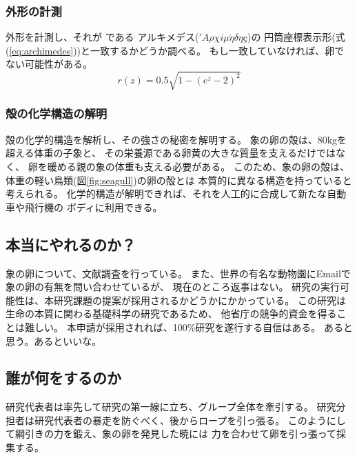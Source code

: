 \documentclass[11pt,a4j,dvipdfmx]{jarticle} 					%
\newcommand{\研究課題名}{象の卵}
\newcommand{\研究機関名}{逢坂大学}
\newcommand{\研究代表者氏名}{湯川秀樹}
\newcommand{\研究期間の最終元号年度}{8}  %
\begin{document}
\subsubsection{外形の計測}
        外形を計測し、それが
        である
        アルキメデス(\('A\rho\chi i\mu\acute{\eta}\delta\eta\mbox{\c{c}}\))の
        円筒座標表示形(式(\ref{eq:archimedes}))と一致するかどうか調べる。
        もし一致していなければ、卵でない可能性がある。
        \begin{equation}
        	\label{eq:archimedes}
        	r(z) = 0.5\sqrt{1-(e^z-2)^2}
        \end{equation}

\subsubsection{殻の化学構造の解明}
	殻の化学的構造を解析し、その強さの秘密を解明する。
	象の卵の殻は、80kgを超える体重の子象と、
	その栄養源である卵黄の大きな質量を支えるだけではなく、
	卵を暖める親の象の体重も支える必要がある。
	このため、象の卵の殻は、体重の軽い鳥類(図\ref{fig:seagull})の卵の殻とは
	本質的に異なる構造を持っていると考えられる。
	化学的構造が解明できれば、それを人工的に合成して新たな自動車や飛行機の
	ボディに利用できる。

\subsection{本当にやれるのか？}
	象の卵について、文献調査を行っている。
	また、世界の有名な動物園にEmailで象の卵の有無を問い合わせているが、
	現在のところ返事はない。
	研究の実行可能性は、本研究課題の提案が採用されるかどうかにかかっている。
	この研究は生命の本質に関わる基礎科学の研究であるため、
	他省庁の競争的資金を得ることは難しい。
	本申請が採用されれば、100\%研究を遂行する自信はある。
	あると思う。あるといいな。

\subsection{誰が何をするのか}
	研究代表者は率先して研究の第一線に立ち、グループ全体を牽引する。
	研究分担者は研究代表者の暴走を防ぐべく、後からロープを引っ張る。
	このようにして綱引きの力を鍛え、象の卵を発見した暁には
	力を合わせて卵を引っ張って採集する。

		
\end{document}

